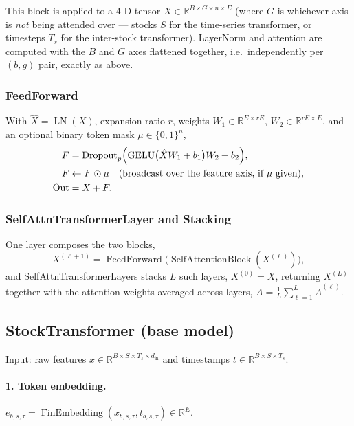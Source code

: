 \documentclass[stu,floatsintext]{apa7}
\newcommand{\R}{\mathbb{R}}
\newcommand{\LN}{\operatorname{LN}}
\newcommand{\GELU}{\operatorname{GELU}}
\begin{document}
This block is applied to a 4-D tensor $X\in\R^{B\times G\times n\times E}$ (where $G$ is
whichever axis is \emph{not} being attended over — stocks $S$ for the time-series transformer, or
timesteps $T_s$ for the inter-stock transformer). LayerNorm and attention are computed with the $B$ and
$G$ axes flattened together, i.e.\ independently per $(b,g)$ pair, exactly as above.

\subsubsection{FeedForward}

With $\hat X = \LN(X)$, expansion ratio $r$, weights $W_1\in\R^{E\times rE}$, $W_2\in\R^{rE\times E}$, and
an optional binary token mask $\mu\in\{0,1\}^{n}$,
\begin{align}
  F &= \operatorname{Dropout}_p\Bigl(\GELU\bigl(\hat X W_1+b_1\bigr)W_2+b_2\Bigr), \\
  F &\leftarrow F \odot \mu \quad \text{(broadcast over the feature axis, if }\mu\text{ given)}, \\
  \operatorname{Out} &= X + F.
\end{align}

\subsubsection{SelfAttnTransformerLayer and Stacking}

One layer composes the two blocks,
\begin{equation}
  X^{(\ell+1)} = \operatorname{FeedForward}\bigl(\operatorname{SelfAttentionBlock}(X^{(\ell)})\bigr),
\end{equation}
and SelfAttnTransformerLayers stacks $L$ such layers, $X^{(0)}=X$, returning $X^{(L)}$ together
with the attention weights averaged across layers, $\bar A = \tfrac1L\sum_{\ell=1}^{L} \bar A^{(\ell)}$.

\subsection{StockTransformer (base model)}

Input: raw features $x\in\R^{B\times S\times T_s\times d_{\mathrm{in}}}$ and timestamps
$t\in\R^{B\times S\times T_s}$.

\paragraph{1. Token embedding.} $e_{b,s,\tau} = \operatorname{FinEmbedding}(x_{b,s,\tau}, t_{b,s,\tau}) \in\R^{E}$.
\end{document}
